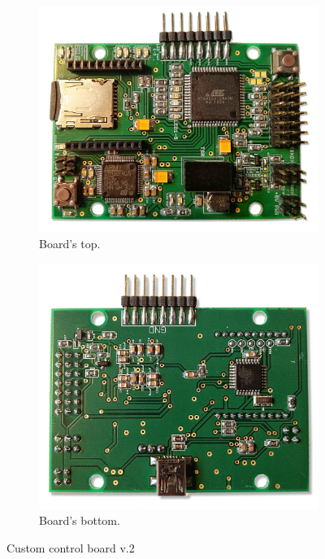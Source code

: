 \begin{figure}[htbp]
\centering

\begin{subfigure}[b]{0.515\textwidth}
	\includegraphics[width=\textwidth]{fig/board1.jpg}
	\caption{Board's top.}
	\label{fig:board_top}
\end{subfigure}%
\begin{subfigure}[b]{0.485\textwidth}
	\includegraphics[width=\textwidth]{fig/board2.jpg}
	\caption{Board's bottom.}
	\label{fig:board_bottom}
\end{subfigure}

\caption{Custom control board v.2}
\label{fig:custom_board}
\end{figure}

